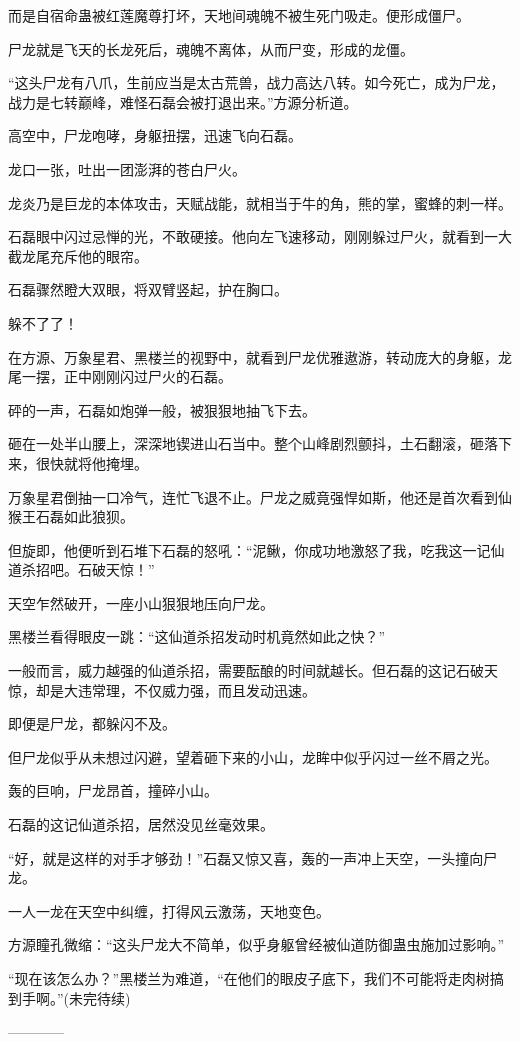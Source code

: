 \begin{this_body}
而是自宿命蛊被红莲魔尊打坏，天地间魂魄不被生死门吸走。便形成僵尸。

尸龙就是飞天的长龙死后，魂魄不离体，从而尸变，形成的龙僵。

“这头尸龙有八爪，生前应当是太古荒兽，战力高达八转。如今死亡，成为尸龙，战力是七转巅峰，难怪石磊会被打退出来。”方源分析道。

高空中，尸龙咆哮，身躯扭摆，迅速飞向石磊。

龙口一张，吐出一团澎湃的苍白尸火。

龙炎乃是巨龙的本体攻击，天赋战能，就相当于牛的角，熊的掌，蜜蜂的刺一样。

石磊眼中闪过忌惮的光，不敢硬接。他向左飞速移动，刚刚躲过尸火，就看到一大截龙尾充斥他的眼帘。

石磊骤然瞪大双眼，将双臂竖起，护在胸口。

躲不了了！

在方源、万象星君、黑楼兰的视野中，就看到尸龙优雅遨游，转动庞大的身躯，龙尾一摆，正中刚刚闪过尸火的石磊。

砰的一声，石磊如炮弹一般，被狠狠地抽飞下去。

砸在一处半山腰上，深深地锲进山石当中。整个山峰剧烈颤抖，土石翻滚，砸落下来，很快就将他掩埋。

万象星君倒抽一口冷气，连忙飞退不止。尸龙之威竟强悍如斯，他还是首次看到仙猴王石磊如此狼狈。

但旋即，他便听到石堆下石磊的怒吼：“泥鳅，你成功地激怒了我，吃我这一记仙道杀招吧。石破天惊！”

天空乍然破开，一座小山狠狠地压向尸龙。

黑楼兰看得眼皮一跳：“这仙道杀招发动时机竟然如此之快？”

一般而言，威力越强的仙道杀招，需要酝酿的时间就越长。但石磊的这记石破天惊，却是大违常理，不仅威力强，而且发动迅速。

即便是尸龙，都躲闪不及。

但尸龙似乎从未想过闪避，望着砸下来的小山，龙眸中似乎闪过一丝不屑之光。

轰的巨响，尸龙昂首，撞碎小山。

石磊的这记仙道杀招，居然没见丝毫效果。

“好，就是这样的对手才够劲！”石磊又惊又喜，轰的一声冲上天空，一头撞向尸龙。

一人一龙在天空中纠缠，打得风云激荡，天地变色。

方源瞳孔微缩：“这头尸龙大不简单，似乎身躯曾经被仙道防御蛊虫施加过影响。”

“现在该怎么办？”黑楼兰为难道，“在他们的眼皮子底下，我们不可能将走肉树搞到手啊。”(未完待续)

------------

\end{this_body}

